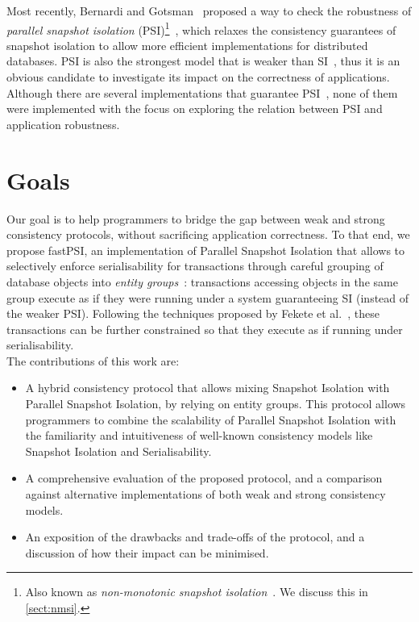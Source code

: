 Most recently, Bernardi and Gotsman~\citep{concur_robustness} proposed a way to check the robustness of \emph{parallel snapshot isolation} (PSI)\footnote{Also known as \emph{non-monotonic snapshot isolation}~\citep{ardekani_nmsi}. We discuss this in \textsection\ref{sect:nmsi}.}~\citep{psi-intro}, which relaxes the consistency guarantees of snapshot isolation to allow more efficient implementations for distributed databases. PSI is also the strongest model that is weaker than SI~\citep{concur_framework}, thus it is an obvious candidate to investigate its impact on the correctness of applications. Although there are several implementations that guarantee PSI~\citep{psi-intro, ardekani_nmsi, moniz_blotter}, none of them were implemented with the focus on exploring the relation between PSI and application robustness.

\section{Goals}

Our goal is to help programmers to bridge the gap between weak and strong consistency protocols, without sacrificing application correctness. To that end, we propose fastPSI, an implementation of Parallel Snapshot Isolation that allows to selectively enforce serialisability for transactions through careful grouping of database objects into \emph{entity groups}~\citep{baker_megastore}: transactions accessing objects in the same group execute as if they were running under a system guaranteeing SI (instead of the weaker PSI). Following the techniques proposed by Fekete et al.~\citep{fekete_ssi}, these transactions can be further constrained so that they execute as if running under serialisability.\\

The contributions of this work are:

\begin{itemize}
    \item A hybrid consistency protocol that allows mixing Snapshot Isolation with Parallel Snapshot Isolation, by relying on entity groups. This protocol allows programmers to combine the scalability of Parallel Snapshot Isolation with the familiarity and intuitiveness of well-known consistency models like Snapshot Isolation and Serialisability.

    \item A comprehensive evaluation of the proposed protocol, and a comparison against alternative implementations of both weak and strong consistency models.

    \item An exposition of the drawbacks and trade-offs of the protocol, and a discussion of how their impact can be minimised.
\end{itemize}

